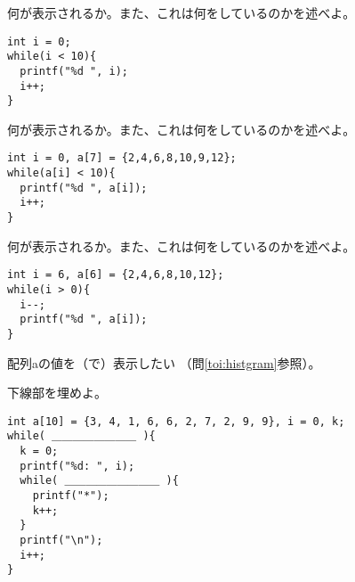 \documentclass[12pt,a4j]{jarticle}
\newcounter{toi}
\def\toi{%
\bigskip\bigskip\noindent
\addtocounter{toi}{1}
\shadowbox{\bfseries\large 問\thetoi}
\nopagebreak[4]\bigskip\nopagebreak[4]
}
\begin{document}



\toi

何が表示されるか。また、これは何をしているのかを述べよ。
\begin{verbatim}
int i = 0;
while(i < 10){
  printf("%d ", i);
  i++;
}
\end{verbatim}






\toi

何が表示されるか。また、これは何をしているのかを述べよ。
\begin{verbatim}
int i = 0, a[7] = {2,4,6,8,10,9,12};
while(a[i] < 10){
  printf("%d ", a[i]);
  i++;
}
\end{verbatim}






\toi

何が表示されるか。また、これは何をしているのかを述べよ。
\begin{verbatim}
int i = 6, a[6] = {2,4,6,8,10,12};
while(i > 0){
  i--;
  printf("%d ", a[i]);
}
\end{verbatim}




\toi

配列{\ttfamily a}の値を（{\ttfamily *}で）表示したい
（問\ref{toi:histgram}参照）。

下線部を埋めよ。
\begin{verbatim}
int a[10] = {3, 4, 1, 6, 6, 2, 7, 2, 9, 9}, i = 0, k;
while( ＿＿＿＿＿＿＿＿ ){
  k = 0;
  printf("%d: ", i);
  while( ＿＿＿＿＿＿＿＿＿ ){
    printf("*");
    k++;
  }
  printf("\n");
  i++;
}
\end{verbatim}

\end{document}
